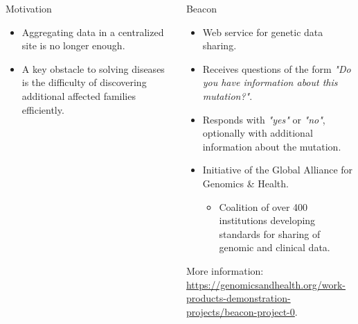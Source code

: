\documentclass{beamer}
\begin{document}
\begin{frame}[fragile]
\begin{columns}[T]
\begin{column}{.32\textwidth}
\begin{block}{Motivation\hfill{}}
\begin{itemize}
\begin{itemize}
\begin{flushright}
	\end{flushright}
	\vspace{-2mm}
	\end{itemize}
\item Aggregating data in a centralized site is no longer enough.
\item A key obstacle to solving diseases is the difficulty of discovering additional affected families efficiently.
\end{itemize}
\vspace{-1mm}
\end{block}
\end{column}

\begin{column}{.31\textwidth}
\begin{block}{Beacon \hfill{}}
\begin{itemize}
\item Web service for genetic data sharing.
\item Receives questions of the form \textit{"Do you have information about this mutation?"}.
\item Responds with \textit{"yes"} or \textit{"no"}, optionally with additional information about the mutation.
\item Initiative of the Global Alliance for Genomics \& Health.
	\begin{itemize}
	\item Coalition of over 400 institutions developing standards for sharing of genomic and clinical data.
	\end{itemize}
\end{itemize}
More information: \url{https://genomicsandhealth.org/work-products-demonstration-projects/beacon-project-0}.
\end{block}


\end{column}
\end{columns}
\end{frame}
\end{document}
